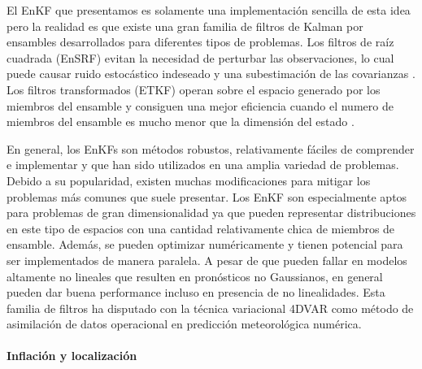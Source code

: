 El EnKF que presentamos es solamente una implementación sencilla de esta idea pero la realidad es que existe una gran familia de filtros de Kalman por ensambles desarrollados para diferentes tipos de problemas. Los filtros de raíz cuadrada (EnSRF) evitan la necesidad de perturbar las observaciones, lo cual puede causar ruido estocástico indeseado y una subestimación de las covarianzas \citep{Whitaker2002, Anderson2001}. Los filtros transformados (ETKF) operan sobre el espacio generado por los miembros del ensamble y consiguen una mejor eficiencia cuando el numero de miembros del ensamble es mucho menor que la dimensión del estado \citep{Bishop2001}.

En general, los EnKFs son métodos robustos, relativamente fáciles de comprender e implementar y que han sido utilizados en una amplia variedad de problemas. Debido a su popularidad, existen muchas modificaciones para mitigar los problemas más comunes que suele presentar. Los EnKF son especialmente aptos para problemas de gran dimensionalidad ya que pueden representar distribuciones en este tipo de espacios con una cantidad relativamente chica de miembros de ensamble. Además, se pueden optimizar numéricamente y tienen potencial para ser implementados de manera paralela. A pesar de que pueden fallar en modelos altamente no lineales que resulten en pronósticos no Gaussianos, en general pueden dar buena performance incluso en presencia de no linealidades. Esta familia de filtros ha disputado con la técnica variacional 4DVAR como método de asimilación de datos operacional en predicción meteorológica numérica.

\paragraph{Inflación y localización} \

